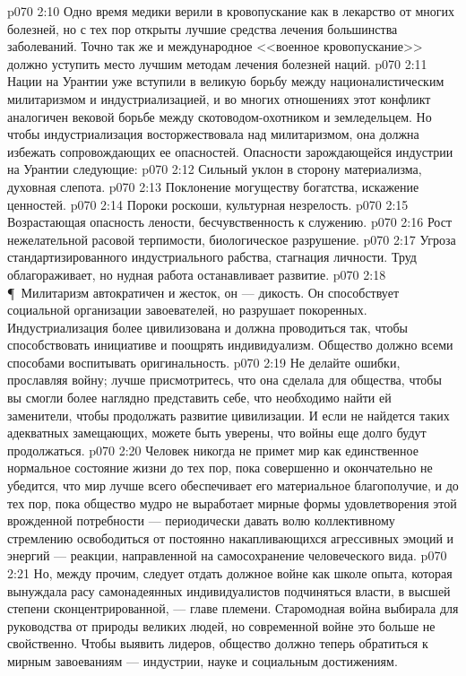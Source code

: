 \vs p070 2:10 Одно время медики верили в кровопускание как в лекарство от многих болезней, но с тех пор открыты лучшие средства лечения большинства заболеваний. Точно так же и международное <<военное кровопускание>> должно уступить место лучшим методам лечения болезней наций.
\vs p070 2:11 Нации на Урантии уже вступили в великую борьбу между националистическим милитаризмом и индустриализацией, и во многих отношениях этот конфликт аналогичен вековой борьбе между скотоводом\hyp{}охотником и земледельцем. Но чтобы индустриализация восторжествовала над милитаризмом, она должна избежать сопровождающих ее опасностей. Опасности зарождающейся индустрии на Урантии следующие:
\vs p070 2:12 \bibnobreakspace Сильный уклон в сторону материализма, духовная слепота.
\vs p070 2:13 \bibnobreakspace Поклонение могуществу богатства, искажение ценностей.
\vs p070 2:14 \bibnobreakspace Пороки роскоши, культурная незрелость.
\vs p070 2:15 \bibnobreakspace Возрастающая опасность лености, бесчувственность к служению.
\vs p070 2:16 \bibnobreakspace Рост нежелательной расовой терпимости, биологическое разрушение.
\vs p070 2:17 \bibnobreakspace Угроза стандартизированного индустриального рабства, стагнация личности. Труд облагораживает, но нудная работа останавливает развитие.
\vs p070 2:18 \P\ Милитаризм автократичен и жесток, он --- дикость. Он способствует социальной организации завоевателей, но разрушает покоренных. Индустриализация более цивилизована и должна проводиться так, чтобы способствовать инициативе и поощрять индивидуализм. Общество должно всеми способами воспитывать оригинальность.
\vs p070 2:19 Не делайте ошибки, прославляя войну; лучше присмотритесь, что она сделала для общества, чтобы вы смогли более наглядно представить себе, что необходимо найти ей заменители, чтобы продолжать развитие цивилизации. И если не найдется таких адекватных замещающих, можете быть уверены, что войны еще долго будут продолжаться.
\vs p070 2:20 Человек никогда не примет мир как единственное нормальное состояние жизни до тех пор, пока совершенно и окончательно не убедится, что мир лучше всего обеспечивает его материальное благополучие, и до тех пор, пока общество мудро не выработает мирные формы удовлетворения этой врожденной потребности --- периодически давать волю коллективному стремлению освободиться от постоянно накапливающихся агрессивных эмоций и энергий --- реакции, направленной на самосохранение человеческого вида.
\vs p070 2:21 Но, между прочим, следует отдать должное войне как школе опыта, которая вынуждала расу самонадеянных индивидуалистов подчиняться власти, в высшей степени сконцентрированной, --- главе племени. Старомодная война выбирала для руководства от природы великих людей, но современной войне это больше не свойственно. Чтобы выявить лидеров, общество должно теперь обратиться к мирным завоеваниям --- индустрии, науке и социальным достижениям.
